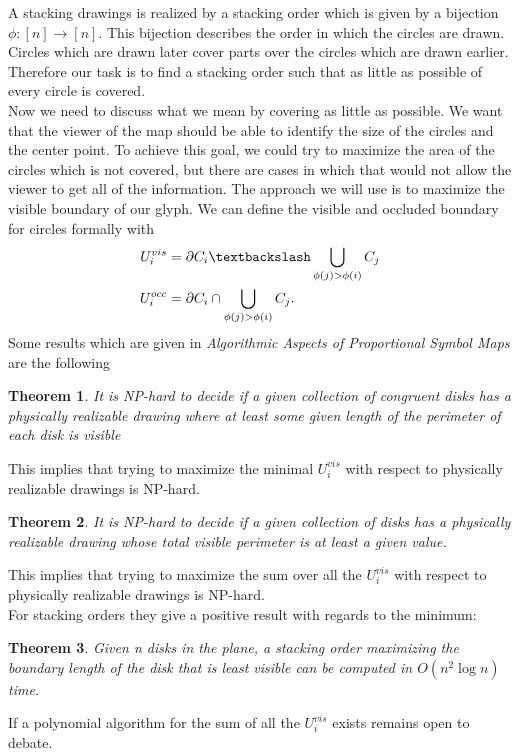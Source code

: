 \documentclass[a4paper,11pt]{article}
\newtheorem{theorem}{Theorem}
\begin{document}
A stacking drawings is realized by a stacking order which is given by a bijection $\phi: [n]\rightarrow [n]$. This bijection describes the order in which the circles are drawn. Circles which are drawn later cover parts over the circles which are drawn earlier. Therefore our task is to find a stacking order such that as little as possible of every circle is covered. \\
Now we need to discuss what we mean by covering as little as possible. We want that the viewer of the map should be able to identify the size of the circles and the center point. To achieve this goal, we could try to maximize the area of the circles which is not covered, but there are cases in which that would not allow the viewer to get all of the information. The approach we will use is to maximize the visible boundary of our glyph. We can define the visible and occluded boundary for circles formally with\\
%
\begin{align*}
U_i^{vis}&=\partial C_i\textbackslash \bigcup_{\phi(j)>\phi(i)} C_{j}\\
U_i^{occ}&=\partial C_i \cap \bigcup_{\phi(j)>\phi(i)} C_{j}.\\
\end{align*}
Some results which are given in \textit{Algorithmic Aspects of Proportional Symbol Maps} are the following
\begin{theorem}
It is NP-hard to decide if a given collection of congruent disks has a
physically realizable drawing where at least some given length of the perimeter of
each disk is visible
\end{theorem}
This implies that trying to maximize the minimal $U_i^{vis}$ with respect to physically realizable drawings is NP-hard.
\begin{theorem}
It is NP-hard to decide if a given collection of disks has a physically
realizable drawing whose total visible perimeter is at least a given value.
\end{theorem}
This implies that trying to maximize the sum over all the $U_i^{vis}$ with respect to physically realizable drawings is NP-hard.\\
For stacking orders they give a positive result with regards to the minimum:
\begin{theorem}
Given n disks in the plane, a stacking order maximizing the boundary
length of the disk that is least visible can be computed in $O(n^2 \log n)$ time.
\end{theorem}
If a polynomial algorithm for the sum of all the $U_i^{vis}$ exists remains open to debate.\\
\end{document}
